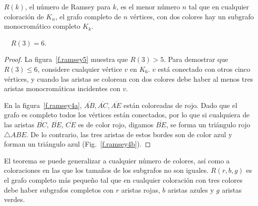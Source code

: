 \begin{definition}
$R(k)$, el número de Ramsey para $k$, es el menor número $n$ tal que en cualquier coloración de $K_{n}$, el grafo completo de $n$ vértices, con dos colores hay un subgrafo monocromático completo $K_k$.
\end{definition}
\begin{theorem}[Ramsey]
$\quad R(3)=6$.\label{thm.ramsey}
\end{theorem}

\begin{proof}
La figura~\ref{f.ramsey5} muestra que $R(3)>5$. Para demostrar que $R(3)\leq 6$, considere cualquier vértice $v$ en $K_6$. $v$ está conectado con otros cinco vértices, y cuando las aristas se colorean con dos colores debe haber al menos tres aristas monocromáticas incidentes con $v$. 

En la figura~\ref{f.ramsey4a}, $\overline{AB}, \overline{AC}, \overline{AE}$ están coloreadas de rojo. Dado que el grafo es completo todos los vértices están conectados, por lo que si cualquiera de las aristas $\overline{BC}$, $\overline{BE}$, $\overline{CE}$ es de color rojo, digamos $\overline{BE}$, se forma un triángulo rojo $\triangle ABE$. De lo contrario, las tres aristas de estos bordes son de color azul y forman un triángulo azul (Fig.~\ref{f.ramsey4b}).
\end{proof}

El teorema se puede generalizar a cualquier número de colores, así como a coloraciones en las que los tamaños de los subgrafos no son iguales. $R(r,b,g)$ es el grafo completo más pequeño tal que en cualquier coloración con tres colores debe haber subgrafos completos con $r$ aristas rojas, $b$ aristas azules y $g$ aristas verdes.

